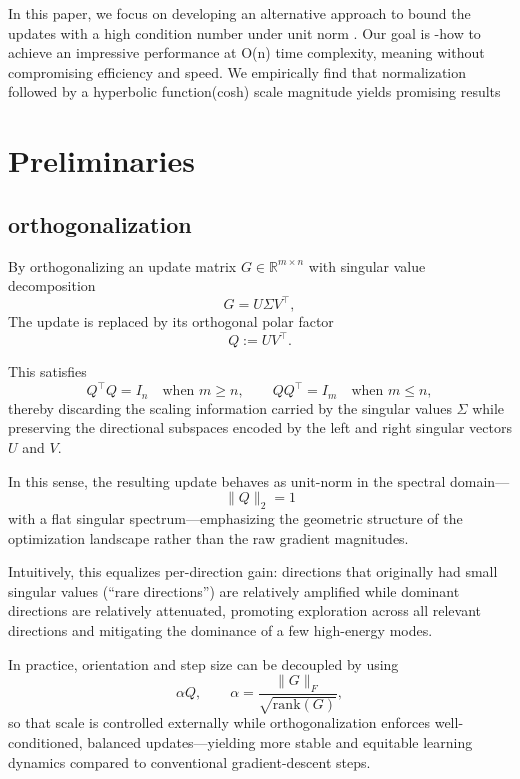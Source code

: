 \documentclass[12pt,a4paper]{article}
\begin{document}
In this paper, we focus on developing an alternative approach to bound the updates with a high condition number under  unit norm  . Our goal is -how to achieve an impressive performance at O(n) time complexity, meaning without compromising efficiency and speed. 
We empirically find that  normalization followed by a hyperbolic function(cosh) scale magnitude yields promising results 


\section{Preliminaries}

\subsection{orthogonalization}





By orthogonalizing an update matrix 
$G \in \mathbb{R}^{m \times n}$ 
with singular value decomposition 
\[
G = U \Sigma V^{\top},
\]
The update is replaced by its orthogonal polar factor
\[
Q := U V^{\top}.
\]

This satisfies
\[
Q^{\top}Q = I_n \quad \text{when } m \geq n,
\qquad
QQ^{\top} = I_m \quad \text{when } m \leq n,
\]
thereby discarding the scaling information carried by the singular values 
$\Sigma$ while preserving the directional subspaces encoded by the left and right singular vectors $U$ and $V$.

In this sense, the resulting update behaves as unit-norm in the spectral domain—
\[
\|Q\|_{2} = 1
\]
with a flat singular spectrum—emphasizing the geometric structure of the optimization landscape rather than the raw gradient magnitudes.

Intuitively, this equalizes per-direction gain: directions that originally had small singular values (“rare directions”) are relatively amplified while dominant directions are relatively attenuated, promoting exploration across all relevant directions and mitigating the dominance of a few high-energy modes. 

In practice, orientation and step size can be decoupled by using 
\[
\alpha Q,
\qquad 
\alpha = \frac{\|G\|_{F}}{\sqrt{\mathrm{rank}(G)}},
\]
so that scale is controlled externally while orthogonalization enforces well-conditioned, balanced updates—yielding more stable and equitable learning dynamics compared to conventional gradient-descent steps.
\end{document}
